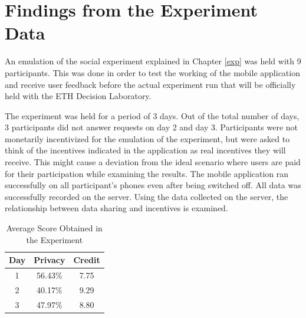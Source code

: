 \section{Findings from the Experiment Data}


An emulation of the social experiment explained in Chapter \ref{exp} was held with 9 participants. This was done in order to test the working of the mobile application and receive user feedback before the actual experiment run that will be officially held with the ETH Decision Laboratory.

The experiment was held for a period of 3 days. Out of the total number of days, 3 participants did not answer requests on day 2 and day 3. Participants were not monetarily incentivized for the emulation of the experiment, but were asked to think of the incentives indicated in the application as real incentives they will receive. This might cause a deviation from the ideal scenario where users are paid for their participation while examining the results. The mobile application ran successfully on all participant's phones even after being switched off. All data was successfully recorded on the server. Using the data collected on the server, the relationship between data sharing and incentives is examined.

\begin{table}[h!]
  \centering
  \caption{Average Score Obtained in the Experiment}
  \label{tab:score}
  \begin{tabular}{ccc}
    \toprule
    Day&Privacy&Credit \\
    \midrule
	1&56.43\%&7.75\\
	2&40.17\%&9.29\\
	3&47.97\%&8.80\\
\bottomrule
  \end{tabular}
\end{table} 

